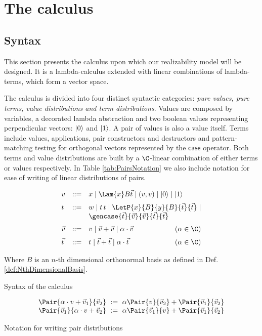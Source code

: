 \section{The calculus}\label{sec:calculus}
\subsection{Syntax}

This section presents the calculus upon which our realizability model will be designed. It is a lambda-calculus extended with linear combinations of lambda-terms, which form a vector space.

The calculus is divided into four distinct syntactic categories: \textit{pure values, pure terms, value distributions and term distributions}. Values are composed by variables, a decorated lambda abstraction and two boolean values representing perpendicular vectors: $\left\vert{0}\right\rangle$ and $\left\vert{1}\right\rangle$. A pair of values is also a value itself. Terms include values, applications, pair constructors and destructors and pattern-matching testing for orthogonal vectors represented by the $\mathsf{case}$ operator. Both terms and value distributions are built by a $\C$-linear combination of either terms or values respectively. In Table \ref{tab:PairsNotation} we also include notation for ease of writing of linear distributions of pairs.


\begin{table*}[t]
  \small
  \[\begin{array}{l@{\quad}rll@{}}
    v&::=& x \mid \Lam{x}B{\vec{t}} \mid (v, v) \mid\ket{0} \mid \ket{1} \\[6pt]
    t&::=& w \mid  t\,t \mid \LetP{x}{B}{y}{B}{\vec{t}}{\vec{t}} 
    \mid\\
    &&\gencase{\vec{t}}{\vec{v}}{\vec{v}}{\vec{t}}{\vec{t}}\\[6pt]
    \vec{v}&::=& v \mid \vec{v}+\vec{v} \mid 
    \alpha\cdot\vec{v}\qquad\hfill(\alpha\in\C)\\[6pt]
    \vec{t}&::=&
    t \mid \vec{t}+\vec{t} \mid 
    \alpha\cdot\vec{t}\qquad\hfill(\alpha\in\C)
   \end{array}
  \]
   
  Where $B$ is an $n$-th dimensional orthonormal basis as defined in Def. \ref{def:NthDimensionalBasis}.

  \caption{Syntax of the calculus}
  \label{tab:Syntax}
\end{table*}

 \begin{table*}[tb]
  \[
    \begin{array}{c}
      \Pair{\alpha\cdot v+\vec{v}_1}{\vec{v}_2}~ := ~\alpha\Pair{v}{\vec{v}_2} + \Pair{\vec{v}_1}{\vec{v}_2}\\
      \Pair{\vec{v}_1}{\alpha\cdot v+\vec{v}_2}~ := ~\alpha\Pair{\vec{v}_1}{v} + \Pair{\vec{v}_1}{\vec{v}_2}
    \end{array}
  \]
  \caption{Notation for writing pair distributions}
  \label{tab:PairsNotation}
 \end{table*}

